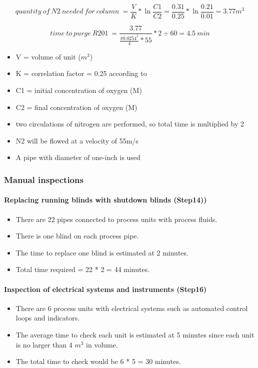     \begin{equation}
        quantity\:of\:N2\:needed\:for\:column\:=\frac{V}{K} * \ln \frac{C1}{C2} = \frac{0.31}{0.25} * \ln \frac{0.21}{0.01} = 3.77 m^3
    \end{equation}
    
    \begin{equation}
        time\:to\:purge\:R201\:=\frac{3.77}{\frac{\pi 0.0254^2}{4} * 55} * 2 \div 60 = 4.5\:min
    \end{equation}
    
    \begin{itemize}
        \item V = volume of unit ($m^3$)
        \item K = correlation factor = 0.25 according to \textcite{}
        \item C1 = initial concentration of oxygen (M)
        \item C2 = final concentration of oxygen (M)
        \item two circulations of nitrogen are performed, so total time is multiplied by 2
        \item N2 will be flowed at a velocity of 55m/s
        \item A pipe with diameter of one-inch is used
    \end{itemize}

\subsubsection{Manual inspections} 
\paragraph{Replacing running blinds with shutdown blinds (Step14))}
    \begin{itemize}
        \item There are 22 pipes connected to process units with process fluids.
        \item There is one blind on each process pipe.
        \item The time to replace one blind is estimated at 2 minutes.
        \item Total time required = 22 * 2 = 44 minutes.
    \end{itemize}
    
\paragraph{Inspection of electrical systems and instruments (Step16)}
    \begin{itemize}
        \item There are 6 process units with electrical systems such as automated control loops and indicators.
        \item The average time to check each unit is estimated at 5 minutes since each unit is no larger than 4 $m^3$ in volume.
        \item The total time to check would be 6 * 5 = 30 minutes.
    \end{itemize}
    
